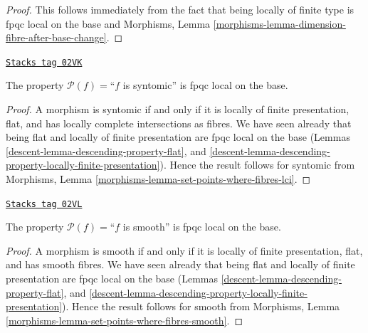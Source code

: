 \begin{proof}
This follows immediately from the fact that being locally of finite
type is fpqc local on the base and
Morphisms, Lemma \ref{morphisms-lemma-dimension-fibre-after-base-change}.
\end{proof}

\begin{lemma}
\label{descent-lemma-descending-property-syntomic}
\href{https://stacks.math.columbia.edu/tag/02VK}{\texttt{Stacks tag 02VK}}

The property $\mathcal{P}(f) =$``$f$ is syntomic''
is fpqc local on the base.
\end{lemma}

\begin{proof}

A morphism is syntomic if and only if it is locally of finite presentation,
flat, and has locally complete intersections as fibres. We have seen
already that being flat and locally of finite presentation are
fpqc local on the base (Lemmas
\ref{descent-lemma-descending-property-flat}, and
\ref{descent-lemma-descending-property-locally-finite-presentation}).
Hence the result follows for syntomic from
Morphisms, Lemma \ref{morphisms-lemma-set-points-where-fibres-lci}.
\end{proof}

\begin{lemma}
\label{descent-lemma-descending-property-smooth}
\href{https://stacks.math.columbia.edu/tag/02VL}{\texttt{Stacks tag 02VL}}

The property $\mathcal{P}(f) =$``$f$ is smooth''
is fpqc local on the base.
\end{lemma}

\begin{proof}

A morphism is smooth if and only if it is locally of finite presentation,
flat, and has smooth fibres. We have seen
already that being flat and locally of finite presentation are
fpqc local on the base (Lemmas
\ref{descent-lemma-descending-property-flat}, and
\ref{descent-lemma-descending-property-locally-finite-presentation}).
Hence the result follows for smooth from
Morphisms, Lemma \ref{morphisms-lemma-set-points-where-fibres-smooth}.
\end{proof}

